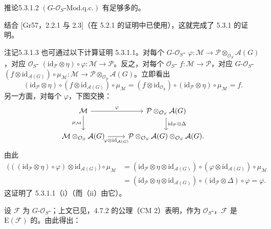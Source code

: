 \begin{SGAresult}{推论}{5.3.1.2}
 $(G\text{-}\mathcal O_S\text{-}\mathrm{Mod.q.c.})$ 有足够多的。
\end{SGAresult}
结合 [Gr57，2.2.1 与 2.3]（在 5.2.1 的证明中已使用），这就完成了 5.3.1 的证明。

\begin{SGAresult}{注记}{5.3.1.3}
也可通过以下计算证明 5.3.1.1。对每个 $G$-$\mathcal O_S$- $\varphi:\mathcal M\to\mathcal P\otimes_{\mathcal O_S}\mathcal A(G)$，对应 $\mathcal O_S$- $(\mathrm{id}_{\mathcal P}\otimes\eta)\circ\varphi:\mathcal M\to\mathcal P$。反之，对每个 $\mathcal O_S$- $f:\mathcal M\to\mathcal P$，对应 $G$-$\mathcal O_S$- $(f\otimes\mathrm{id}_{\mathcal A(G)})\circ\mu_{\mathcal M}:\mathcal M\to\mathcal P\otimes_{\mathcal O_S}\mathcal A(G)$。立即看出
\[
(\mathrm{id}_{\mathcal P}\otimes\eta)\circ(f\otimes\mathrm{id}_{\mathcal A(G)})\circ\mu_{\mathcal M}=(f\otimes\mathrm{id}_{\mathcal O_S})\circ(\mathrm{id}_{\mathcal P}\otimes\eta)\circ\mu_{\mathcal M}=f.
\]
另一方面，对每个 $\varphi$，下图交换：
\[
\begin{tikzcd}
\mathcal M\arrow[r,"{\varphi}"]\arrow[d,"{\mu_{\mathcal M}}"']&\mathcal P\otimes_{\mathcal O_S}\mathcal A(G)\arrow[d,"{\mathrm{id}_{\mathcal P}\otimes\Delta}"]\\
\mathcal M\otimes_{\mathcal O_S}\mathcal A(G)\arrow[r,"{\varphi\otimes\mathrm{id}_{\mathcal A(G)}}"']&\mathcal P\otimes_{\mathcal O_S}\mathcal A(G)\otimes_{\mathcal O_S}\mathcal A(G).
\end{tikzcd}
\]
由此
\[
\begin{aligned}
\bigl(((\mathrm{id}_{\mathcal P}\otimes\eta)\circ\varphi)\otimes\mathrm{id}_{\mathcal A(G)}\bigr)\circ\mu_{\mathcal M}
&=(\mathrm{id}_{\mathcal P}\otimes\eta\otimes\mathrm{id}_{\mathcal A(G)})\circ(\varphi\otimes\mathrm{id}_{\mathcal A(G)})\circ\mu_{\mathcal M}\\
&=(\mathrm{id}_{\mathcal P}\otimes\eta\otimes\mathrm{id}_{\mathcal A(G)})\circ(\mathrm{id}_{\mathcal P}\otimes\Delta)\circ\varphi=\varphi.
\end{aligned}
\]
这证明了 5.3.1.1（i）（而（ii）由它）。
\end{SGAresult}
设 $\mathcal F$ 为 $G$-$\mathcal O_S$-；上文已见，4.7.2 的公理（CM 2）表明，作为 $\mathcal O_S$-，$\mathcal F$ 是 $\mathrm E(\mathcal F)$ 的。由此得出：
